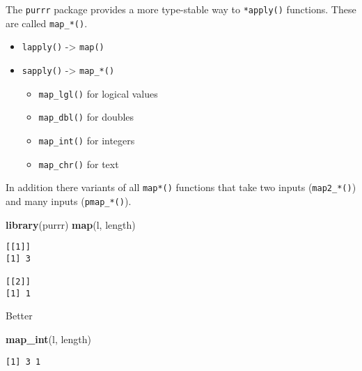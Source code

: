 \documentclass[ignorenonframetext,,t]{beamer}
\let\oldtextbf\textbf
\renewcommand{\textbf}[1]{\textcolor{spamwell}{\oldtextbf{#1}}}
\providecommand{\tightlist}{%
\setlength{\itemsep}{0pt}\setlength{\parskip}{0pt}}
\newenvironment{Shaded}{\begin{snugshade}}{\end{snugshade}}
\newcommand{\FunctionTok}[1]{\textcolor[rgb]{0.13,0.29,0.53}{\textbf{#1}}}
\newcommand{\NormalTok}[1]{#1}
\providecommand{\tightlist}{%
\setlength{\itemsep}{0pt}\setlength{\parskip}{0pt}}
\renewcommand{\tightlist}{\setlength{\itemsep}{1.4ex}\setlength{\parskip}{0pt}}
\begin{document}
\begin{frame}[fragile]
The \texttt{purrr} package provides a more type-stable way to
\texttt{*apply()} functions. These are called \texttt{map\_*()}.

\begin{itemize}
\tightlist
\item
  \texttt{lapply()} -\textgreater{} \texttt{map()}
\item
  \texttt{sapply()} -\textgreater{} \texttt{map\_*()}

  \begin{itemize}
  \tightlist
  \item
    \texttt{map\_lgl()} for logical values
  \item
    \texttt{map\_dbl()} for doubles
  \item
    \texttt{map\_int()} for integers
  \item
    \texttt{map\_chr()} for text
  \end{itemize}
\end{itemize}

In addition there variants of all \texttt{map*()} functions that take
two inputs (\texttt{map2\_*()}) and many inputs (\texttt{pmap\_*()}).
\end{frame}

\begin{frame}[fragile]
\begin{Shaded}
\begin{Highlighting}[]
\FunctionTok{library}\NormalTok{(purrr)}
\FunctionTok{map}\NormalTok{(l, length)}
\end{Highlighting}
\end{Shaded}

\begin{verbatim}
[[1]]
[1] 3

[[2]]
[1] 1
\end{verbatim}

Better

\begin{Shaded}
\begin{Highlighting}[]
\FunctionTok{map\_int}\NormalTok{(l, length)}
\end{Highlighting}
\end{Shaded}

\begin{verbatim}
[1] 3 1
\end{verbatim}
\end{frame}
\end{document}
